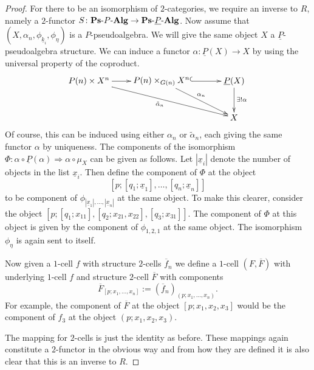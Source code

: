 \begin{proof}
For there to be an isomorphism of $2$-categories, we require an inverse to $R$, namely a $2$-functor $S \colon \mathbf{Ps}\mbox{-}P\mbox{-}\mathbf{Alg} \rightarrow \mathbf{Ps}\mbox{-}\underline{P}\mbox{-}\mathbf{Alg}$. Now assume that $(X, \alpha_n, \phi_{\underline{k}_i}, \phi_\eta)$ is a $P$-pseudoalgebra.  We will give the same object $X$ a $\underline{P}$-pseudoalgebra structure. We can induce a functor $\alpha \colon \underline{P}(X) \rightarrow X$ by using the universal property of the coproduct.
    \[
        \xy
            (-30,0)*+{P(n) \times X^n}="-10";
            (0,0)*+{P(n) \times_{G(n)} X^n}="00";
            (30,0)*+{\underline{P}(X)}="10";
            (30,-15)*+{X}="11";
            {\ar "-10" ; "00"};
            {\ar^{\alpha_n} "00" ; "11"};
            {\ar@{^{(}->} "00" ; "10"};
            {\ar^{\exists ! \alpha} "10" ; "11"};
            {\ar_{\tilde{\alpha}_n} "-10" ; "11"};
        \endxy
    \]
Of course, this can be induced using either $\alpha_n$ or $\tilde{\alpha}_n$, each giving the same functor $\alpha$ by uniqueness. The components of the isomorphism $\Phi \colon \alpha \circ \underline{P}(\alpha) \Rightarrow \alpha \circ \mu_X$ can be given as follows. Let $|\underline{x}_i|$ denote the number of objects in the list $\underline{x}_i$. Then define the component of $\Phi$ at the object
    \[
        [p;[q_1;\underline{x}_1],\ldots,[q_n;\underline{x}_n]]
    \]
to be component of $\phi_{|\underline{x}_1|, \ldots, |\underline{x}_n|}$ at the same object. To make this clearer, consider the object $[p;[q_1;x_{11}],[q_2;x_{21},x_{22}],[q_3;x_{31}]]$. The component of $\Phi$ at this object is given by the component of $\phi_{1,2,1}$ at the same object. The isomorphism $\phi_\eta$ is again sent to itself.

Now given a $1$-cell $f$ with structure $2$-cells $\overline{f}_n$ we define a $1$-cell $(F,\overline{F})$ with underlying $1$-cell $f$ and structure $2$-cell $\overline{F}$ with components
    \[
        \overline{F}_{[p;x_1, \ldots, x_n]} := \left(\overline{f}_{n}\right)_{(p;x_1,\ldots,x_n)}.
    \]
For example, the component of $\overline{F}$ at the object $[p;x_1,x_2,x_3]$ would be the component of $f_3$ at the object $(p;x_1,x_2,x_3)$.

The mapping for $2$-cells is just the identity as before. These mappings again constitute a $2$-functor in the obvious way and from how they are defined it is also clear that this is an inverse to $R$.
\end{proof}

